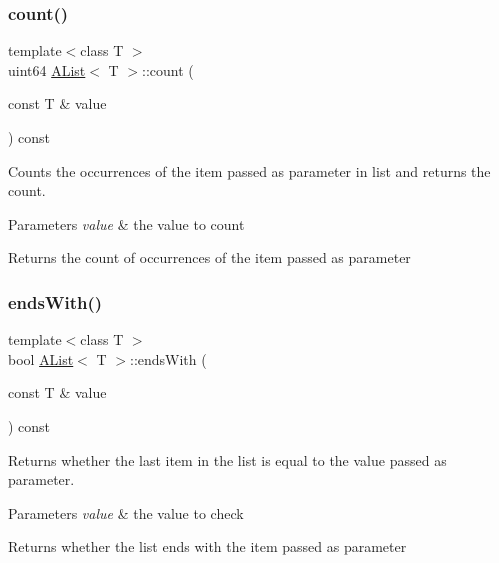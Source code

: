 \subsubsection{\texorpdfstring{count()}{count()}}
{\footnotesize\ttfamily template$<$class T $>$ \\
uint64 \mbox{\hyperlink{class_a_list}{A\+List}}$<$ T $>$\+::count (\begin{DoxyParamCaption}\item[{const T \&}]{value }\end{DoxyParamCaption}) const}



Counts the occurrences of the item passed as parameter in list and returns the count. 


\begin{DoxyParams}{Parameters}
{\em value} & the value to count \\
\hline
\end{DoxyParams}
\begin{DoxyReturn}{Returns}
the count of occurrences of the item passed as parameter 
\end{DoxyReturn}
\mbox{\label{class_a_list_af6383e2209b2baa7c0e602b82d586cf9}} 
\subsubsection{\texorpdfstring{endsWith()}{endsWith()}}
{\footnotesize\ttfamily template$<$class T $>$ \\
bool \mbox{\hyperlink{class_a_list}{A\+List}}$<$ T $>$\+::ends\+With (\begin{DoxyParamCaption}\item[{const T \&}]{value }\end{DoxyParamCaption}) const}



Returns whether the last item in the list is equal to the value passed as parameter. 


\begin{DoxyParams}{Parameters}
{\em value} & the value to check \\
\hline
\end{DoxyParams}
\begin{DoxyReturn}{Returns}
whether the list ends with the item passed as parameter 
\end{DoxyReturn}
\mbox{\label{class_a_list_aca24663d0fe32d878cd4a214ade18372}} 
